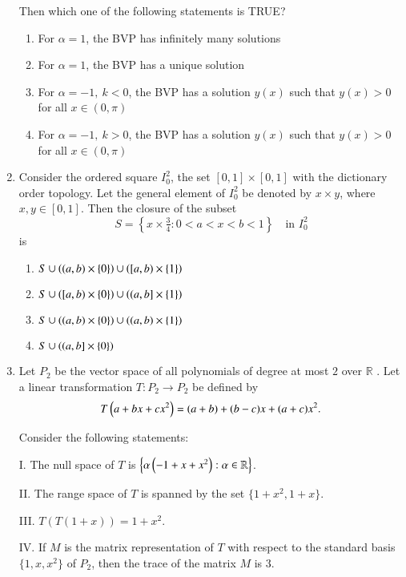 \documentclass[journal,12pt,onecolumn]{IEEEtran}
\theoremstyle{remark}
\begin{document}
\begin{enumerate}[start=1, label=Q.\arabic*]
Then which one of the following statements is TRUE?
\begin{enumerate}
\item For $\alpha=1$, the BVP has infinitely many solutions
\item For $\alpha=1$, the BVP has a unique solution
\item For $\alpha=-1, \ k<0$, the BVP has a solution $y(x)$ such that $y(x)>0$ for all $x\in(0,\pi)$
\item For $\alpha=-1, \ k>0$, the BVP has a solution $y(x)$ such that $y(x)>0$ for all $x\in(0,\pi)$
\end{enumerate}

\hfill{}


\item Consider the ordered square $I_{0}^{2}$, the set $[0,1]\times[0,1]$ with the dictionary order topology. Let the general element of $I_{0}^{2}$ be denoted by $x\times y$, where $x,y\in[0,1]$. Then the closure of the subset
\[
S=\left\{x\times \tfrac{3}{4} : 0<a<x<b<1 \right\}\quad \text{in } I_{0}^{2}
\]
is
\begin{enumerate}
\item $S \cup \left((a,b)\times\{0\}\right) \cup \left([a,b)\times\{1\}\right)$
\item $S \cup \left([a,b)\times\{0\}\right) \cup \left((a,b]\times\{1\}\right)$
\item $S \cup \left((a,b)\times\{0\}\right) \cup \left((a,b)\times\{1\}\right)$
\item $S \cup \left((a,b]\times\{0\}\right)$
\end{enumerate}

\hfill{}
\item Let $P_{2}$ be the vector space of all polynomials of degree at most $2$ over $\mathbb{R}$ . Let a linear transformation $T: P_{2}\to P_{2}$ be defined by
\[
T\left(a+bx+cx^{2}\right)=(a+b)+(b-c)x+(a+c)x^{2}.
\]

Consider the following statements:  

I. The null space of $T$ is $\left\{\alpha \left(-1+x+x^{2}\right) : \alpha \in \mathbb{R}\right\}$.  

II. The range space of $T$ is spanned by the set $\{1+x^{2},1+x\}$.  

III. $T(T(1+x))=1+x^{2}$.  

IV. If $M$ is the matrix representation of $T$ with respect to the standard basis $\{1,x,x^{2}\}$ of $P_{2}$, then the trace of the matrix $M$ is $3$.  


\end{enumerate}
\end{document}
